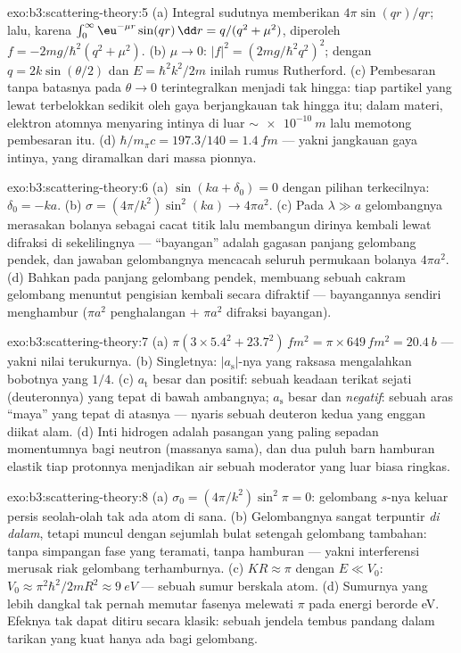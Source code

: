 \begin{solution}{exo:b3:scattering-theory:5}
(a) Integral sudutnya memberikan $4\pi\sin(qr)/qr$; lalu, karena
$\int_0^\infty\eu^{-\mu r}\sin(qr)\,\dd r = q/(q^2 + \mu^2)$,
diperoleh $f = -2mg/\hbar^2(q^2 + \mu^2)$. (b) $\mu \to 0$: $|f|^2 =
(2mg/\hbar^2q^2)^2$; dengan $q = 2k\sin(\theta/2)$ dan $E =
\hbar^2k^2/2m$ inilah rumus Rutherford. (c) Pembesaran tanpa batasnya pada $\theta \to
0$ terintegralkan menjadi tak hingga: tiap partikel
yang lewat terbelokkan sedikit oleh gaya berjangkauan tak hingga itu;
dalam materi, elektron atomnya menyaring intinya di luar
$\sim\qty{e-10}{m}$ lalu memotong pembesaran itu. (d) $\hbar/m_\pi c = 197.3/140 = \qty{1.4}{fm}$
--- yakni jangkauan gaya intinya, yang diramalkan dari massa pionnya.
\end{solution}

\begin{solution}{exo:b3:scattering-theory:6}
(a) $\sin(ka + \delta_0) = 0$ dengan pilihan terkecilnya: $\delta_0
= -ka$. (b) $\sigma = (4\pi/k^2)\sin^2(ka) \to 4\pi a^2$. (c) Pada
$\lambda \gg a$ gelombangnya merasakan bolanya sebagai cacat titik lalu
membangun dirinya kembali lewat difraksi di sekelilingnya ---
``bayangan'' adalah gagasan panjang gelombang pendek, dan jawaban
gelombangnya mencacah seluruh permukaan bolanya $4\pi a^2$. (d) Bahkan
pada panjang gelombang pendek, membuang sebuah cakram gelombang menuntut
pengisian kembali secara difraktif --- bayangannya sendiri menghambur
($\pi a^2$ penghalangan $+$ $\pi a^2$ difraksi bayangan).
\end{solution}

\begin{solution}{exo:b3:scattering-theory:7}
(a) $\pi(3 \times 5.4^2 + 23.7^2)\,\unit{fm^2} = \pi \times 649
\,\unit{fm^2} = \qty{20.4}{b}$ --- yakni nilai terukurnya. (b)
Singletnya: $|a_{\text{s}}|$-nya yang raksasa mengalahkan bobotnya yang
$1/4$. (c)
$a_{\text{t}}$ besar dan positif: sebuah keadaan terikat sejati
(deuteronnya) yang tepat di bawah ambangnya; $a_{\text{s}}$ besar dan
\emph{negatif}: sebuah aras ``maya'' yang tepat di atasnya --- nyaris
sebuah deuteron kedua yang enggan diikat alam. (d) Inti hidrogen adalah
pasangan yang paling sepadan momentumnya bagi neutron
(massanya sama), dan dua puluh barn hamburan elastik tiap protonnya
menjadikan air sebuah moderator yang luar biasa ringkas.
\end{solution}

\begin{solution}{exo:b3:scattering-theory:8}
(a) $\sigma_0 = (4\pi/k^2)\sin^2\pi = 0$: gelombang $s$-nya keluar
persis seolah-olah tak ada atom di sana. (b) Gelombangnya sangat
terpuntir \emph{di dalam}, tetapi muncul dengan sejumlah bulat setengah
gelombang tambahan: tanpa simpangan fase yang teramati, tanpa hamburan
--- yakni interferensi merusak riak gelombang terhamburnya. (c) $KR
\approx \pi$ dengan $E \ll V_0$: $V_0 \approx \pi^2\hbar^2/2mR^2
\approx \qty{9}{eV}$ --- sebuah sumur berskala atom. (d) Sumurnya yang
lebih dangkal tak pernah memutar fasenya melewati $\pi$ pada energi
berorde eV. Efeknya tak dapat ditiru secara klasik: sebuah jendela
tembus pandang dalam tarikan yang kuat hanya ada bagi gelombang.
\end{solution}

